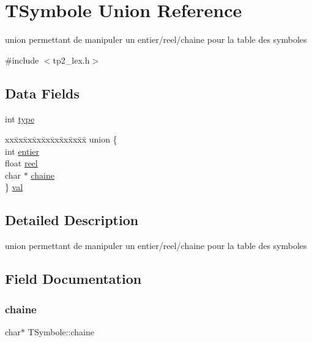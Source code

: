 \hypertarget{structTSymbole}{}\section{T\+Symbole Union Reference}
\label{structTSymbole}


union permettant de manipuler un entier/reel/chaine pour la table des symboles  




{\ttfamily \#include $<$tp2\+\_\+lex.\+h$>$}

\subsection*{Data Fields}
\begin{DoxyCompactItemize}
\item 
int \hyperlink{structTSymbole_a3f1c09d456d42f56c7e97b767fcda611}{type}
\item 
\begin{tabbing}
xx\=xx\=xx\=xx\=xx\=xx\=xx\=xx\=xx\=\kill
union \{\\
\>int \hyperlink{structTSymbole_a3b836b307d4dec1ad2cf5790f0d179cb}{entier}\\
\>float \hyperlink{structTSymbole_afc2415b8445e939938f13807dad56550}{reel}\\
\>char $\ast$ \hyperlink{structTSymbole_a9662a05800f8adab9fd9a9c4b70b903d}{chaine}\\
\} \hyperlink{structTSymbole_a448dc40c2c8e5d050436fa598f528723}{val}\\

\end{tabbing}\end{DoxyCompactItemize}


\subsection{Detailed Description}
union permettant de manipuler un entier/reel/chaine pour la table des symboles 

\subsection{Field Documentation}
\mbox{\label{structTSymbole_a9662a05800f8adab9fd9a9c4b70b903d}} 
\subsubsection{\texorpdfstring{chaine}{chaine}}
{\footnotesize\ttfamily char$\ast$ T\+Symbole\+::chaine}

